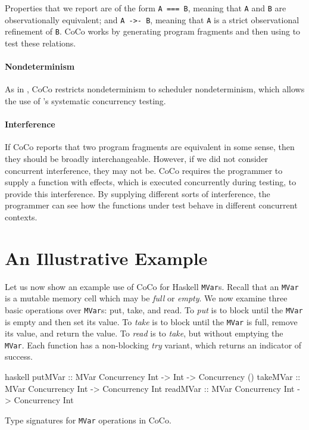 Properties that we report are of the form \verb|A === B|, meaning that
\verb|A| and \verb|B| are observationally equivalent; and
\verb|A ->- B|, meaning that \verb|A| is a strict observational
refinement of \verb|B|.  CoCo works by generating program fragments
and then using \dejafu{} to test these relations.

\paragraph{Nondeterminism}
As in \dejafu{}, CoCo restricts nondeterminism to scheduler
nondeterminism, which allows the use of \dejafu{}'s systematic
concurrency testing.

\paragraph{Interference}
If CoCo reports that two program fragments are equivalent in some
sense, then they should be broadly interchangeable.  However, if we
did not consider concurrent interference, they may not be.  CoCo
requires the programmer to supply a function with effects, which is
executed concurrently during testing, to provide this interference.
By supplying different sorts of interference, the programmer can see
how the functions under test behave in different concurrent contexts.

\section{An Illustrative Example}
\label{sec:coco-example}

Let us now show an example use of CoCo for Haskell \verb|MVar|s.
Recall that an \verb|MVar| is a mutable memory cell which may be
\emph{full} or \emph{empty}.  We now examine three basic operations
over \verb|MVar|s: put, take, and read.  To \emph{put} is to block
until the \verb|MVar| is empty and then set its value.  To \emph{take}
is to block until the \verb|MVar| is full, remove its value, and
return the value.  To \emph{read} is to \emph{take}, but without
emptying the \verb|MVar|.  Each function has a non-blocking \emph{try}
variant, which returns an indicator of success.

\begin{listing}
\centering
\begin{cminted}{haskell}
putMVar  :: MVar Concurrency Int -> Int -> Concurrency ()
takeMVar :: MVar Concurrency Int -> Concurrency Int
readMVar :: MVar Concurrency Int -> Concurrency Int
\end{cminted}
\caption{Type signatures for \texttt{MVar} operations in CoCo.}\label{lst:mvar_types}
\end{listing}

